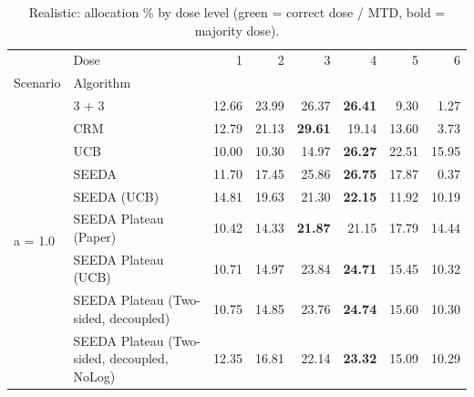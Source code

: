 \begin{table}[H]
\centering
\caption{Realistic: allocation \% by dose level (green = correct dose / MTD, bold = majority dose).}
\label{tab:real_alloc_by_dose}
\begin{tabular}{llrrrrrr}
\toprule
 & Dose & 1 & 2 & 3 & 4 & 5 & 6 \\
Scenario & Algorithm &  &  &  &  &  &  \\
\midrule
\multirow[c]{9}{*}{a = 1.0} & 3 + 3 & 12.66 & 23.99 & {\cellcolor[HTML]{C8E6C9}} 26.37 & \bfseries 26.41 & 9.30 & 1.27 \\
 & CRM & 12.79 & 21.13 & {\cellcolor[HTML]{C8E6C9}} \bfseries 29.61 & 19.14 & 13.60 & 3.73 \\
 & UCB & 10.00 & 10.30 & {\cellcolor[HTML]{C8E6C9}} 14.97 & \bfseries 26.27 & 22.51 & 15.95 \\
 & SEEDA & 11.70 & 17.45 & {\cellcolor[HTML]{C8E6C9}} 25.86 & \bfseries 26.75 & 17.87 & 0.37 \\
 & SEEDA (UCB) & 14.81 & 19.63 & {\cellcolor[HTML]{C8E6C9}} 21.30 & \bfseries 22.15 & 11.92 & 10.19 \\
 & SEEDA Plateau (Paper) & 10.42 & 14.33 & {\cellcolor[HTML]{C8E6C9}} \bfseries 21.87 & 21.15 & 17.79 & 14.44 \\
 & SEEDA Plateau (UCB) & 10.71 & 14.97 & {\cellcolor[HTML]{C8E6C9}} 23.84 & \bfseries 24.71 & 15.45 & 10.32 \\
 & SEEDA Plateau (Two-sided, decoupled) & 10.75 & 14.85 & {\cellcolor[HTML]{C8E6C9}} 23.76 & \bfseries 24.74 & 15.60 & 10.30 \\
 & SEEDA Plateau (Two-sided, decoupled, NoLog) & 12.35 & 16.81 & {\cellcolor[HTML]{C8E6C9}} 22.14 & \bfseries 23.32 & 15.09 & 10.29 \\
\bottomrule
\end{tabular}
\end{table}
